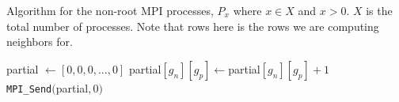 \documentclass{article}
\begin{document}
\begin{algorithm}[t]
    \caption{Algorithm for the non-root MPI processes, $P_x$ where $x \in X$ and $x > 0$. $X$ is the total number of processes. Note that rows here is the rows we are computing neighbors for. }\label{alg:1}
    \begin{algorithmic}
        \State partial $\gets [0, 0, 0, ..., 0]$
            \State partial$[g_{n}][g_p] \gets $partial$[g_{n}][g_p] + 1$
        \EndIf
        \EndWhile \\
        \State \texttt{MPI\_Send}$($partial$, 0)$
    \end{algorithmic}
\end{algorithm}
\end{document}

